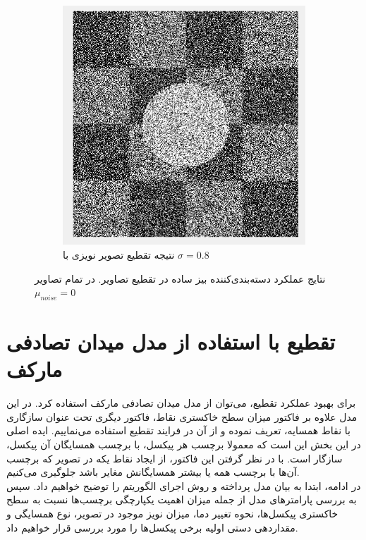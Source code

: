 \documentclass[11.5pt,a4paper]{article}
\begin{document}
\begin{figure}[h]
\begin{subfigure}{.3\textwidth}
		\includegraphics[scale=0.2]{Imgs/NB_S8_Res.png}
		\caption{نتیجه تقطیع تصویر نویزی با $\sigma=0.8$}
	\end{subfigure}
\caption{نتایج عملکرد دسته‌بندی‌کننده بیز ساده در تقطیع تصاویر. در تمام تصاویر  
$\mu_{noise} = 0$
}
\label{fig:NB_Res}
\end{figure} 
\section{تقطیع با استفاده از مدل میدان تصادفی مارکف }
برای بهبود عملکرد تقطیع،‌ می‌توان از مدل میدان تصادفی مارکف استفاده کرد. در این مدل علاوه بر فاکتور میزان سطح خاکستری نقاط،‌ فاکتور دیگری تحت عنوان سازگاری با نقاط همسایه، تعریف نموده و از آن در فرایند تقطیع استفاده می‌نماییم. ایده اصلی در این بخش این است که معمولا برچسب هر پیکسل، با برچسب همسایگان آن پیکسل، سازگار است. با در نظر گرفتن این فاکتور، از ایجاد نقاط یکه در تصویر که برچسب آن‌ها با برچسب همه یا بیشتر همسایگانش مغایر باشد جلوگیری می‌کنیم.\\
در ادامه،‌ ابتدا به بیان مدل پرداخته و روش اجرای الگوریتم را توضیح خواهیم داد. سپس به بررسی پارامترهای مدل از جمله میزان اهمیت یکپارچگی برچسب‌ها نسبت به سطح خاکستری پیکسل‌ها،‌ نحوه تغییر دما، میزان نویز موجود در تصویر، نوع همسایگی و مقداردهی دستی اولیه برخی پیکسل‌ها را مورد بررسی قرار خواهیم داد.
\end{document}
